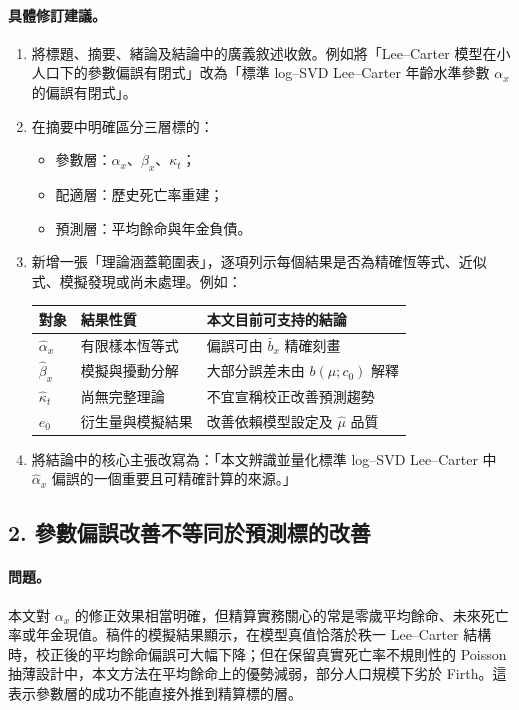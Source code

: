 \documentclass[12pt,a4paper]{article}
\begin{document}
\paragraph{具體修訂建議。}
\begin{enumerate}
  \item 將標題、摘要、緒論及結論中的廣義敘述收斂。例如將「Lee--Carter 模型在小人口下的參數偏誤有閉式」改為「標準 log--SVD Lee--Carter 年齡水準參數 $\alpha_x$ 的偏誤有閉式」。
  \item 在摘要中明確區分三層標的：
  \begin{itemize}
    \item 參數層：$\alpha_x$、$\beta_x$、$\kappa_t$；
    \item 配適層：歷史死亡率重建；
    \item 預測層：平均餘命與年金負債。
  \end{itemize}
  \item 新增一張「理論涵蓋範圍表」，逐項列示每個結果是否為精確恆等式、近似式、模擬發現或尚未處理。例如：
  \begin{center}
  \begin{tabular}{p{3.0cm}p{3.0cm}p{6.5cm}}
  \toprule
  對象 & 結果性質 & 本文目前可支持的結論\\
  \midrule
  $\widehat{\alpha}_x$ & 有限樣本恆等式 & 偏誤可由 $\bar b_x$ 精確刻畫\\
  $\widehat{\beta}_x$ & 模擬與擾動分解 & 大部分誤差未由 $b(\mu;c_0)$ 解釋\\
  $\widehat{\kappa}_t$ & 尚無完整理論 & 不宜宣稱校正改善預測趨勢\\
  $e_0$ & 衍生量與模擬結果 & 改善依賴模型設定及 $\widehat\mu$ 品質\\
  \bottomrule
  \end{tabular}
  \end{center}
  \item 將結論中的核心主張改寫為：「本文辨識並量化標準 log--SVD Lee--Carter 中 $\widehat{\alpha}_x$ 偏誤的一個重要且可精確計算的來源。」
\end{enumerate}

\subsection*{2. 參數偏誤改善不等同於預測標的改善}

\paragraph{問題。}
本文對 $\alpha_x$ 的修正效果相當明確，但精算實務關心的常是零歲平均餘命、未來死亡率或年金現值。稿件的模擬結果顯示，在模型真值恰落於秩一 Lee--Carter 結構時，校正後的平均餘命偏誤可大幅下降；但在保留真實死亡率不規則性的 Poisson 抽薄設計中，本文方法在平均餘命上的優勢減弱，部分人口規模下劣於 Firth。這表示參數層的成功不能直接外推到精算標的層。
\end{document}
